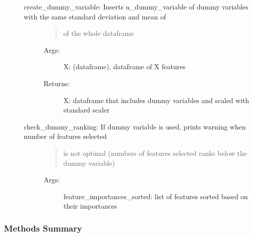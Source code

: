 \documentclass[letterpaper,10pt,english]{sphinxmanual}
\begin{document}
\begin{fulllineitems}
\begin{description}
\begin{description}
\begin{description}
\end{description}

\item[{create\_dummy\_variable: Inserts n\_dummy\_variable of dummy variables with the same standard deviation and mean of}] \leavevmode\begin{quote}

of the whole dataframe
\end{quote}
\begin{description}
\item[{Args:}] \leavevmode
X: (dataframe), dataframe of X features

\item[{Returns:}] \leavevmode
X: dataframe that includes dummy variables and scaled with standard scaler

\end{description}

\item[{check\_dummy\_ranking: If dummy variable is used, prints warning when number of features selected}] \leavevmode\begin{quote}

is not optimal (numbers of features selected ranks below the dummy variable)
\end{quote}
\begin{description}
\item[{Args:}] \leavevmode
feature\_importances\_sorted: list of features sorted based on their importances

\end{description}

\end{description}

\end{description}
\subsubsection*{Methods Summary}


\begin{savenotes}\sphinxatlongtablestart\begin{longtable}[c]{}
\hline

\endfirsthead

%
{}\\
\hline

\endhead

\hline
{}\\
\endfoot


\end{longtable}
\end{savenotes}
\end{fulllineitems}
\end{document}
